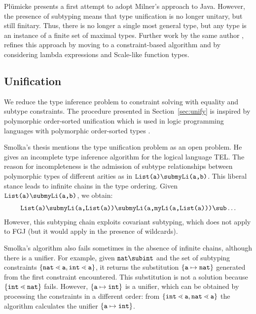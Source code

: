 Pl\"umicke \cite{Plue07_3} presents a first attempt to adopt Milner's
approach to Java. However, the presence of subtyping means that type
unification is no longer unitary, but still finitary. Thus, there is
no longer a single most general type, but any type is an instance of a
finite set of maximal types. Further work by the same author \cite{plue15_2,plue17_2},
refines this approach by moving to a constraint-based algorithm and by
considering lambda expressions and Scale-like function types.



\subsection{Unification}

We reduce the type inference problem to constraint solving with
equality and subtype constraints.
The procedure presented in Section~\ref{sec:unify} is inspired by
polymorphic order-sorted unification which is used in logic 
programming languages with polymorphic order-sorted types
\cite{GS89,MH91,HiTo92,CB95}.

Smolka's thesis \cite{GS89} mentions the type unification problem
as an open problem. He gives  an incomplete type inference algorithm
for the logical language \textsf{TEL}. The reason for incompleteness
is the admission of subtype relationships between polymorphic types of
different arities as in  $\texttt{List(a)} \sub
\texttt{myLi(a,b)}$. This liberal stance leads to infinite chains in
the type ordering.
Given  $\texttt{List(a)} \sub \texttt{myLi(a,b)}$, we obtain:
\begin{gather*}
  \texttt{List(a)} \sub \texttt{myLi(a,List(a))} \sub \texttt{myLi(a,myLi(a,List(a)))}  \sub \dots
\end{gather*}
However, this subtyping chain exploits covariant subtyping, which does
not apply to FGJ (but it would apply in the presence of wildcards).

Smolka's algorithm also fails sometimes in the absence of infinite
chains, although there is a unifier. 
For example, given $\texttt{nat} \sub \texttt{int}$ and the set
of subtyping constraints $\{ \mathtt{nat} \lessdot \mathtt{a},
  \mathtt{int} \lessdot \mathtt{a} \}$, it returns the substitution
$\{ \mathtt{a} \mapsto \mathtt{nat} \}$ generated from the first
constraint encountered. This substitution is not a solution
because $\{ \mathtt{int} \lessdot \mathtt{nat} \}$ fails.
However, $\{ \mathtt{a}\mapsto \mathtt{int} \}$ is a unifier, which
can be obtained by processing the constraints in a different order: from $\{ \mathtt{int} \lessdot \mathtt{a}, \mathtt{nat} \lessdot
  \mathtt{a} \}$ the algorithm calculates the unifier 
$\{ \mathtt{a}\mapsto \mathtt{int} \}$.

